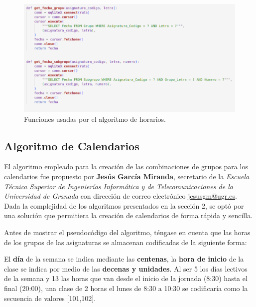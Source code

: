 \begin{figure}[H]
    \centering
    \includegraphics[width=1\textwidth]{./imagenes/get_fecha_grupo_subgrupo.png}
    \caption{Funciones usadas por el algoritmo de horarios.}
    \label{fig:get_fecha_grupo_subgrupo}
\end{figure}





\subsection{Algoritmo de Calendarios}

El algoritmo empleado para la creación de las combinaciones de grupos para los calendarios fue propuesto por \textbf{Jesús García Miranda}, secretario de la \textit{Escuela Técnica Superior de Ingenierías Informática y de Telecomunicaciones de la Universidad de Granada} con dirección de correo electrónico \href{mailto:jesusgm@ugr.es}{jesusgm@ugr.es}. Dada la complejidad de los algoritmos presentados en la sección 2, se optó por una solución que permitiera la creación de calendarios de forma rápida y sencilla.\newline

Antes de mostrar el pseudocódigo del algoritmo, téngase en cuenta que las horas de los grupos de las asignaturas se almacenan codificadas de la siguiente forma:\newline

El \textbf{día} de la semana se indica mediante las \textbf{centenas}, la \textbf{hora de inicio} de la clase se indica por medio de las \textbf{decenas y unidades}. Al ser 5 los días lectivos de la semana y 13 las horas que van desde el inicio de la jornada (8:30) hasta el final (20:00), una clase de 2 horas el lunes de 8:30 a 10:30 se codificaría como la secuencia de valores [101,102].\newline

